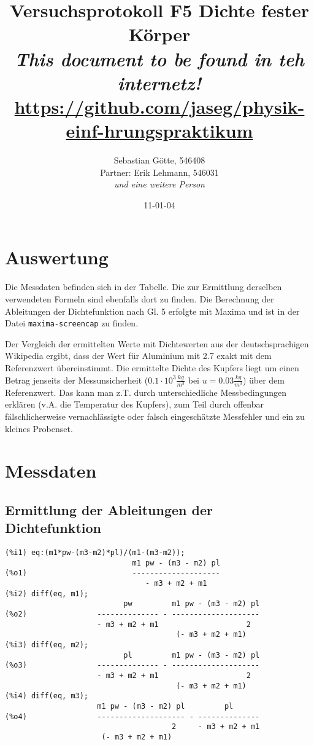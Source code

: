 \documentclass[12pt,a4paper,notitlepage]{article}
\title{Versuchsprotokoll F5 Dichte fester Körper\\
\small\emph{This document to be found in teh internetz!}\\
\url{https://github.com/jaseg/physik-einf-hrungspraktikum}}
\author{Sebastian Götte, 546408\\
Partner: Erik Lehmann, 546031\\
\emph{und eine weitere Person}}
\date{11-01-04}
\begin{document}
\maketitle
\section{Auswertung}
Die Messdaten befinden sich in der Tabelle. Die zur Ermittlung derselben verwendeten Formeln sind ebenfalls dort zu finden. Die Berechnung der Ableitungen der Dichtefunktion nach Gl. 5 erfolgte mit Maxima und ist in der Datei \texttt{maxima-screencap} zu finden.

Der Vergleich der ermittelten Werte mit Dichtewerten aus der deutschsprachigen Wikipedia ergibt, dass der Wert für Aluminium mit 2.7 exakt mit dem Referenzwert übereinstimmt. Die ermittelte Dichte des Kupfers liegt um einen Betrag jenseits der Messunsicherheit ($0.1\cdot 10^3\frac{kg}{m^3}$ bei $u=0.03\frac{kg}{m^3}$) über dem Referenzwert. Das kann man z.T. durch unterschiedliche Messbedingungen erklären (v.A. die Temperatur des Kupfers), zum Teil durch offenbar fälschlicherweise vernachlässigte oder falsch eingeschätzte Messfehler und ein zu kleines Probenset.
\section{Messdaten}
\subsection{Ermittlung der Ableitungen der Dichtefunktion}
\begin{verbatim}
(%i1) eq:(m1*pw-(m3-m2)*pl)/(m1-(m3-m2));
                             m1 pw - (m3 - m2) pl
(%o1)                        --------------------
                                - m3 + m2 + m1
(%i2) diff(eq, m1);
                           pw         m1 pw - (m3 - m2) pl
(%o2)                -------------- - --------------------
                     - m3 + m2 + m1                    2
                                       (- m3 + m2 + m1)
(%i3) diff(eq, m2);
                           pl         m1 pw - (m3 - m2) pl
(%o3)                -------------- - --------------------
                     - m3 + m2 + m1                    2
                                       (- m3 + m2 + m1)
(%i4) diff(eq, m3);
                     m1 pw - (m3 - m2) pl         pl
(%o4)                -------------------- - --------------
                                      2     - m3 + m2 + m1
                      (- m3 + m2 + m1)
\end{verbatim}
\end{document}
